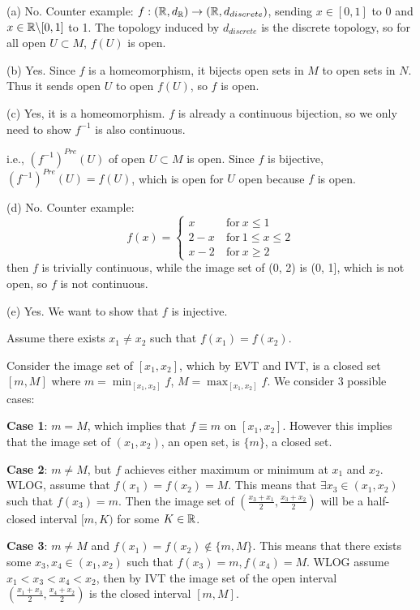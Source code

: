 \documentclass[a4paper, 11pt]{article}
\begin{document}
\begin{solution}
    (a) No. Counter example: $f: (\mathbb{R}, d_{\mathbb{R}}) \to (\mathbb{R}, d_{discrete})$, sending $x \in [0, 1]$ to 0 and $x \in \mathbb{R} \backslash [0, 1]$ to 1. The topology induced by $d_{discrete}$ is the discrete topology, so for all open $U \subset M$, $f(U)$ is open.

    (b) Yes. Since $f$ is a homeomorphism, it bijects open sets in $M$ to open sets in $N$. Thus it sends open $U$ to open $f(U)$, so $f$ is open.

    (c) Yes, it is a homeomorphism. $f$ is already a continuous bijection, so we only need to show $f^{-1}$ is also continuous.

    i.e., $(f^{-1})^{Pre}(U)$ of open $U \subset M$ is open. Since $f$ is bijective, $(f^{-1})^{Pre}(U) = f(U)$, which is open for $U$ open because $f$ is open.

    (d) No. Counter example: \[
    f(x) = \begin{cases}
            x & \:\text{for}\: x \leq 1 \\
            2-x & \:\text{for}\: 1 \leq x \leq 2 \\
            x-2 & \:\text{for}\: x \geq 2
        \end{cases}
    \]
    then $f$ is trivially continuous, while the image set of (0, 2) is (0, 1], which is not open, so $f$ is not continuous.

    (e) Yes. We want to show that $f$ is injective.
    
    Assume there exists $x_1 \neq x_2$ such that $f(x_1) = f(x_2)$.

    Consider the image set of $[x_1, x_2]$, which by EVT and IVT, is a closed set $[m, M]$ where $m = \min_{[x_1, x_2]}f$, $M = \max_{[x_1, x_2]}f$. We consider 3 possible cases:

    \textbf{Case 1}: $m = M$, which implies that $f \equiv m$ on $[x_1, x_2]$. However this implies that the image set of $(x_1, x_2)$, an open set, is $\{m\}$, a closed set. \contra

    \textbf{Case 2}: $m \neq M$, but $f$ achieves either maximum or minimum at $x_1$     and $x_2$. WLOG, assume that $f(x_1) = f(x_2) = M$. This means that $\exists x_3 \in (x_1, x_2)$ such that $f(x_3) = m$. Then the image set of $(\frac{x_3 + x_1}{2}, \frac{x_3 + x_2}{2})$ will be a half-closed interval $[m, K)$ for some $K \in \mathbb{R}$. \contra

    \textbf{Case 3}: $m \neq M$ and $f(x_1) = f(x_2) \not \in \{m, M\}$. This means that there exists some $x_3, x_4 \in (x_1, x_2)$ such that $f(x_3) = m, f(x_4) = M$. WLOG assume $x_1 < x_3 < x_4 < x_2$, then by IVT the image set of the open interval $\left(\frac{x_1 + x_3}{2}, \frac{x_4 + x_2}{2}\right)$ is the closed interval $[m, M]$. \contra


\end{solution}
\end{document}
